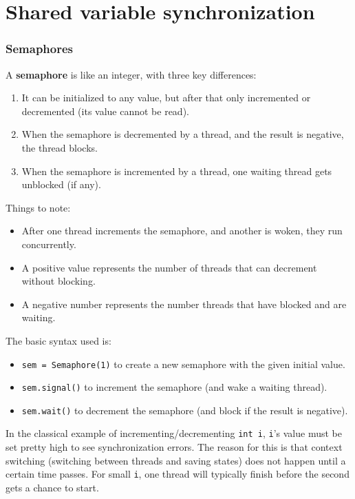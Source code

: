 \part{Shared variable synchronization}
\section{Semaphores}
A \textbf{semaphore} is like an integer, with three key differences:
\begin{enumerate}
    \item It can be initialized to any value, but after that only incremented or decremented (its value cannot be read).
    \item When the semaphore is decremented by a thread, and the result is negative, the thread blocks.
    \item When the semaphore is incremented by a thread, one waiting thread gets unblocked (if any).
\end{enumerate} 
Things to note:
\begin{itemize}
    \item After one thread increments the semaphore, and another is woken, they run concurrently.
    \item A positive value represents the number of threads that can decrement without blocking.
    \item A negative number represents the number threads that have blocked and are waiting.
\end{itemize}
The basic syntax used is:
\begin{itemize}
    \item \texttt{sem = Semaphore(1)} to create a new semaphore with the given initial value.
    \item \texttt{sem.signal()} to increment the semaphore (and wake a waiting thread).
    \item \texttt{sem.wait()} to decrement the semaphore (and block if the result is negative).
\end{itemize}
In the classical example of incrementing/decrementing \texttt{int i}, \texttt{i}'s value must be set pretty high to see synchronization errors. The reason for this is that context switching (switching between threads and saving states) does not happen until a certain time passes. For small \texttt{i}, one thread will typically finish before the second gets a chance to start.



